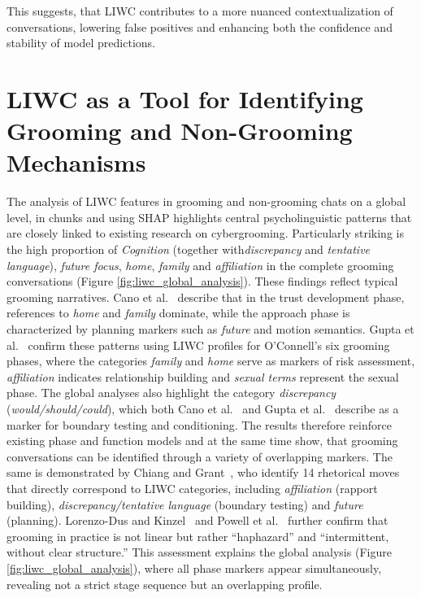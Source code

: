 This suggests, that LIWC contributes to a more nuanced contextualization of conversations, lowering false positives and enhancing both the confidence and stability of model predictions.



\section{LIWC as a Tool for Identifying Grooming and Non-Grooming Mechanisms}

The analysis of LIWC features in grooming and non-grooming chats on a global level, in chunks and using SHAP highlights central psycholinguistic patterns that are closely linked to existing research on cybergrooming. Particularly striking is the high proportion of \textit{Cognition} (together with\textit{discrepancy} and \textit{tentative language}), \textit{future focus}, \textit{home}, \textit{family} and \textit{affiliation} in the complete grooming conversations (Figure \ref{fig:liwc_global_analysis}). These findings reflect typical grooming narratives. Cano et al.~\cite{Cano2014} describe that in the trust development phase, references to \textit{home} and \textit{family} dominate, while the approach phase is characterized by planning markers such as \textit{future} and motion semantics. Gupta et al.~\cite{gupta2012characterizingpedophileconversationsinternet} confirm these patterns using LIWC profiles for O’Connell’s six grooming phases, where the categories \textit{family} and \textit{home} serve as markers of risk assessment, \textit{affiliation} indicates relationship building and \textit{sexual terms} represent the sexual phase. The global analyses also highlight the category \textit{discrepancy} (\textit{would/should/could}), which both Cano et al.~\cite{Cano2014} and Gupta et al.~\cite{gupta2012characterizingpedophileconversationsinternet} describe as a marker for boundary testing and conditioning. The results therefore reinforce existing phase and function models and at the same time show, that grooming conversations can be identified through a variety of overlapping markers. The same is demonstrated by Chiang and Grant~\cite{chiangandgrant2017online}, who identify 14 rhetorical moves that directly correspond to LIWC categories, including \textit{affiliation} (rapport building), \textit{discrepancy/tentative language} (boundary testing) and \textit{future} (planning).  Lorenzo-Dus and Kinzel~\cite{LorenzoDus2019} and Powell et al.~\cite{powell2021online} further confirm that grooming in practice is not linear but rather “haphazard” and “intermittent, without clear structure.” This assessment explains the global analysis (Figure \ref{fig:liwc_global_analysis}), where all phase markers appear simultaneously, revealing not a strict stage sequence but an overlapping profile.

